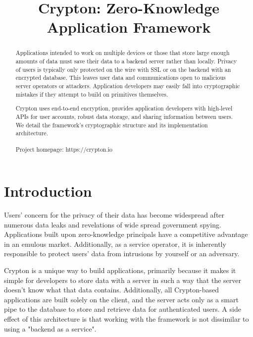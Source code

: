 \documentclass[conference]{IEEEtran}
\begin{document}
\title{Crypton: Zero-Knowledge Application Framework}

\author{
  \and
}

\maketitle

\begin{abstract}
Applications intended to work on multiple devices or those that
store large enough amounts of data must save their data to a backend server
rather than locally. Privacy of users is typically only protected on the wire
with SSL or on the backend with an encrypted database. This leaves user data
and communications open to malicious server operators or attackers.
Application developers may easily fall into cryptographic
mistakes if they attempt to build on primitives themselves.

Crypton uses end-to-end encryption, provides application developers
with high-level APIs for user accounts, robust data storage, and
sharing information between users. We detail the framework's cryptographic
structure and its implementation architecture.
\\
\\
Project homepage: https://crypton.io
\end{abstract}

\section{Introduction}
Users' concern for the privacy of their data has become widespread
after numerous data leaks and revelations of wide spread government spying\cite{spying}.
Applications built upon zero-knowledge principals have a competitive
advantage in an emulous market. Additionally, as a service operator,
it is inherently responsible to protect users' data from intrusions
by yourself or an adversary.

Crypton is a unique way to build applications, primarily because it
makes it simple for developers to store data with a server in such a way
that the server doesn't know what that data contains.
Additionally, all Crypton-based applications are built solely on the client,
and the server acts only as a smart pipe to the database to store and retrieve data
for authenticated users. A side effect of this architecture is that working with
the framework is not dissimilar to using a "backend as a service".
\end{document}

